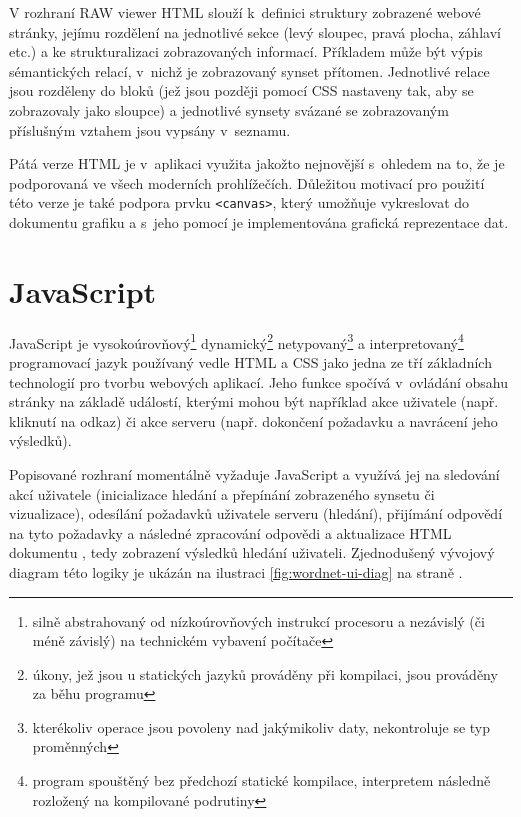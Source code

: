 \documentclass[a4paper,11pt,openany,twoside]{book}
\newcommand{\simplywn}{RAW viewer }
\begin{document}
				V rozhraní \simplywn HTML slouží k~definici struktury zobrazené webové stránky, jejímu rozdělení na jednotlivé sekce (levý sloupec, pravá plocha, záhlaví etc.) a ke strukturalizaci zobrazovaných informací. Příkladem může být výpis sémantických relací, v~nichž je zobrazovaný synset přítomen. Jednotlivé relace jsou rozděleny do bloků (jež jsou později pomocí CSS nastaveny tak, aby se zobrazovaly jako sloupce) a jednotlivé synsety svázané se zobrazovaným příslušným vztahem jsou vypsány v~seznamu. 


				Pátá verze HTML je v~aplikaci využita jakožto nejnovější s~ohledem na to, že je podporovaná ve všech moderních prohlížečích. \parencite{html5support} Důležitou motivací pro použití této verze je také podpora prvku \texttt{<canvas>}, který umožňuje vykreslovat do dokumentu grafiku \parencite{w3schools2017htmlcanvas} a s~jeho pomocí je implementována grafická reprezentace dat. 

			\section{JavaScript}

				JavaScript je vysokoúrovňový\footnote{silně abstrahovaný od nízkoúrovňových instrukcí procesoru a nezávislý (či méně závislý) na technickém vybavení počítače} dynamický\footnote{úkony, jež jsou u statických jazyků prováděny při kompilaci, jsou prováděny za běhu programu} netypovaný\footnote{kterékoliv operace jsou povoleny nad jakýmikoliv daty, nekontroluje se typ proměnných} a interpretovaný\footnote{program spouštěný bez předchozí statické kompilace, interpretem následně rozložený na kompilované podrutiny} programovací jazyk používaný vedle HTML a CSS jako jedna ze tří základních technologií pro tvorbu webových aplikací. Jeho funkce spočívá v~ovládání obsahu stránky na základě událostí, kterými mohou být například akce uživatele (např. kliknutí na odkaz) či akce serveru (např. dokončení požadavku a navrácení jeho výsledků).%

				Popisované rozhraní momentálně vyžaduje JavaScript a využívá jej na sledování akcí uživatele (inicializace hledání a přepínání zobrazeného synsetu či vizualizace), odesílání požadavků uživatele serveru (hledání), přijímání odpovědí na tyto požadavky a následné zpracování odpovědi a aktualizace HTML dokumentu%
				, tedy zobrazení výsledků hledání uživateli. %
				Zjednodušený vývojový diagram této logiky je ukázán na ilustraci \ref{fig:wordnet-ui-diag} na straně \pageref{fig:wordnet-ui-diag}.
\end{document}
